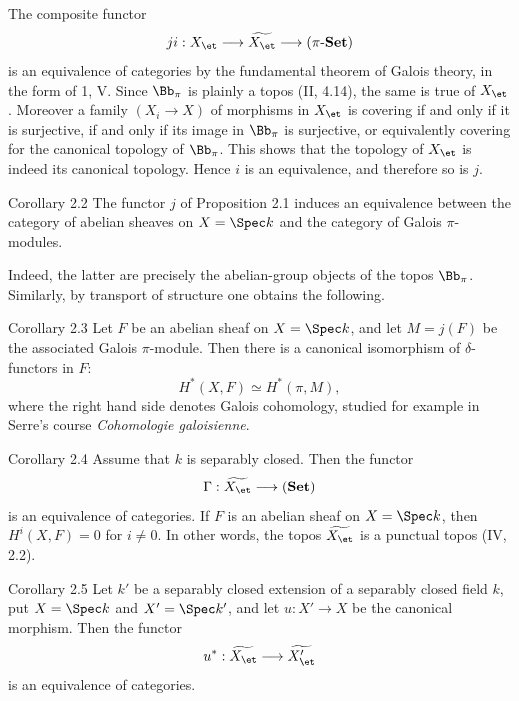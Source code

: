 The composite functor
\[
ji:X_{\et}\longrightarrow \widetilde{X_{\et}}\longrightarrow (\pi\text{-}\mathbf{Set})
\]
is an equivalence of categories by the fundamental theorem of Galois theory, in the form of \SGA{} 1, V. Since \(\Bb_\pi\) is plainly a topos (II, 4.14), the same is true of \(X_{\et}\). Moreover a family \((X_i\to X)\) of morphisms in \(X_{\et}\) is covering if and only if it is surjective, \ie if and only if its image in \(\Bb_\pi\) is surjective, or equivalently covering for the canonical topology of \(\Bb_\pi\). This shows that the topology of \(X_{\et}\) is indeed its canonical topology. Hence \(i\) is an equivalence, and therefore so is \(j\).

\begin{statement}{Corollary 2.2}
The functor \(j\) of Proposition 2.1 induces an equivalence between the category of abelian sheaves on \(X=\Spec k\) and the category of Galois \(\pi\)-modules.
\end{statement}

Indeed, the latter are precisely the abelian-group objects of the topos \(\Bb_\pi\). Similarly, by transport of structure one obtains the following.

\begin{statement}{Corollary 2.3}
Let \(F\) be an abelian sheaf on \(X=\Spec k\), and let \(M=j(F)\) be the associated Galois \(\pi\)-module. Then there is a canonical isomorphism of \(\delta\)-functors in \(F\):
\[
H^*(X,F)\simeq H^*(\pi,M),
\]
where the right hand side denotes Galois cohomology, studied for example in Serre's course \emph{Cohomologie galoisienne}.
\end{statement}

\begin{statement}{Corollary 2.4}
Assume that \(k\) is separably closed. Then the functor
\[
\Gamma:\widetilde{X_{\et}}\longrightarrow (\mathbf{Set})
\]
is an equivalence of categories. If \(F\) is an abelian sheaf on \(X=\Spec k\), then \(H^i(X,F)=0\) for \(i\ne 0\). In other words, the topos \(\widetilde{X_{\et}}\) is a punctual topos (IV, 2.2).
\end{statement}

\begin{statement}{Corollary 2.5}
Let \(k'\) be a separably closed extension of a separably closed field \(k\), put \(X=\Spec k\) and \(X'=\Spec k'\), and let \(u:X'\to X\) be the canonical morphism. Then the functor
\[
u^*:\widetilde{X_{\et}}\longrightarrow \widetilde{X'_{\et}}
\]
is an equivalence of categories.
\end{statement}

